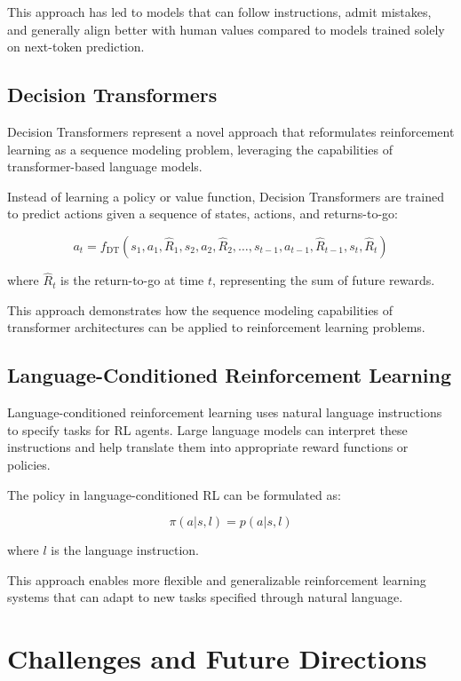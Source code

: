 \documentclass{article}
\begin{document}
This approach has led to models that can follow instructions, admit mistakes, and generally align better with human values compared to models trained solely on next-token prediction.

\subsection{Decision Transformers}

Decision Transformers represent a novel approach that reformulates reinforcement learning as a sequence modeling problem, leveraging the capabilities of transformer-based language models.

Instead of learning a policy or value function, Decision Transformers are trained to predict actions given a sequence of states, actions, and returns-to-go:

\begin{equation}
a_t = f_{\text{DT}}(s_1, a_1, \hat{R}_1, s_2, a_2, \hat{R}_2, \ldots, s_{t-1}, a_{t-1}, \hat{R}_{t-1}, s_t, \hat{R}_t)
\end{equation}

where $\hat{R}_t$ is the return-to-go at time $t$, representing the sum of future rewards.

This approach demonstrates how the sequence modeling capabilities of transformer architectures can be applied to reinforcement learning problems.

\subsection{Language-Conditioned Reinforcement Learning}

Language-conditioned reinforcement learning uses natural language instructions to specify tasks for RL agents. Large language models can interpret these instructions and help translate them into appropriate reward functions or policies.

The policy in language-conditioned RL can be formulated as:

\begin{equation}
\pi(a|s, l) = p(a|s, l)
\end{equation}

where $l$ is the language instruction.

This approach enables more flexible and generalizable reinforcement learning systems that can adapt to new tasks specified through natural language.

\section{Challenges and Future Directions}
\end{document}
